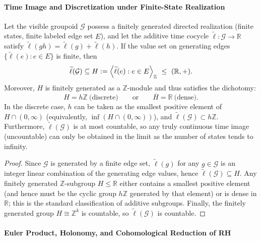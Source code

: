 \paragraph{Time Image and Discretization under Finite-State Realization}

\begin{proposition}\label{prop:xi-finite-state-time-image-discrete-or-dense}
Let the visible groupoid \(\mathcal G\) possess a finitely generated directed realization (finite states, finite labeled edge set \(E\)), and let the additive time cocycle \(\widetilde{\ell}:\mathcal G\to\mathbb R\) satisfy \(\widetilde{\ell}(gh)=\widetilde{\ell}(g)+\widetilde{\ell}(h)\).
If the value set on generating edges \(\{\widetilde{\ell}(e):e\in E\}\) is finite, then
\[
\widetilde{\ell}(\mathcal G)\subseteq
H:=\Bigl\langle \widetilde{\ell}(e):e\in E\Bigr\rangle_{\mathbb Z}\ \le\ (\mathbb R,+).
\]
Moreover, \(H\) is finitely generated as a \(\mathbb Z\)-module and thus satisfies the dichotomy:
\[
H=h\mathbb Z\ \text{(discrete)}\qquad\text{or}\qquad \overline{H}=\mathbb R\ \text{(dense)}.
\]
In the discrete case, \(h\) can be taken as the smallest positive element of \(H\cap(0,\infty)\) (equivalently, \(\inf(H\cap(0,\infty))\)), and \(\widetilde{\ell}(\mathcal G)\subset h\mathbb Z\).
Furthermore, \(\widetilde{\ell}(\mathcal G)\) is at most countable, so any truly continuous time image (uncountable) can only be obtained in the limit as the number of states tends to infinity.
\end{proposition}

\begin{proof}
Since \(\mathcal G\) is generated by a finite edge set, \(\widetilde{\ell}(g)\) for any \(g\in\mathcal G\) is an integer linear combination of the generating edge values, hence \(\widetilde{\ell}(\mathcal G)\subseteq H\).
Any finitely generated \(\mathbb Z\)-subgroup \(H\le\mathbb R\) either contains a smallest positive element (and hence must be the cyclic group \(h\mathbb Z\) generated by that element) or is dense in \(\mathbb R\); this is the standard classification of additive subgroups.
Finally, the finitely generated group \(H\cong \mathbb Z^k\) is countable, so \(\widetilde{\ell}(\mathcal G)\) is countable.
\end{proof}

\paragraph{Euler Product, Holonomy, and Cohomological Reduction of RH}

